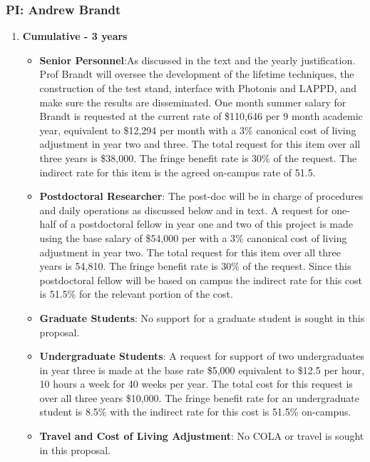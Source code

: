 \subsubsection{\bf PI: Andrew Brandt}

\begin{enumerate}

\item[]{\textbf{Cumulative - 3 years}}

\begin{itemize}[noitemsep,nolistsep]
\item{{\bf Senior Personnel}:As discussed in the text and the yearly justification. Prof Brandt will oversee the development of the lifetime techniques, the construction of the test stand, interface with Photonis and LAPPD, and make sure the results are disseminated. One month summer salary for Brandt is requested at the current rate of \$110,646 per 9 month academic year, equivalent to \$12,294 per month with a 3\% canonical cost of living adjustment in year two and three.  The total request for this item over all three years is \$38,000. The fringe benefit rate is 30\% of the request.  The indirect rate for this item is the agreed on-campus rate of 51.5.}

\item {{\bf Postdoctoral Researcher}: The post-doc will be in charge of procedures and daily operations as discussed below and in text. A request for one-half of a postdoctoral fellow in year one and two of this project is made using the base salary of \$54,000 per with a 3\% canonical cost of living adjustment in year two. The total request for this item over all three years is 54,810.  The fringe benefit rate is 30\% of the request.  Since this postdoctoral fellow will be based on campus the indirect rate for this cost is 51.5\% for the relevant portion of the cost. } 

\item{{\bf Graduate Students}: No support for a graduate student is sought in this proposal. }

\item {{\bf Undergraduate Students}: A request for support of two undergraduates in year three  is made at the base rate \$5,000 equivalent to \$12.5 per hour, 10 hours a week for 40 weeks per year.  The total cost for this request is over all three years \$10,000.  The fringe benefit rate for an undergraduate student is 8.5\% with the indirect rate for this cost is 51.5\% on-campus.}

\item{{\bf Travel and Cost of Living Adjustment}: No COLA or travel is sought in this proposal.}


\end{itemize}
\end{enumerate}
